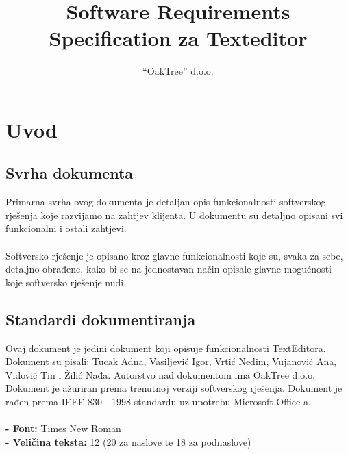 \documentclass[utf8]{article}
\title{Software Requirements Specification za Texteditor}
\author{“OakTree” d.o.o.}
\begin{document}
\maketitle

\section{Uvod}
\subsection{Svrha dokumenta}
Primarna svrha ovog dokumenta je detaljan opis funkcionalnosti softverskog rješenja koje razvijamo na zahtjev klijenta. U dokumentu su detaljno opisani svi funkcionalni i ostali zahtjevi.\\
\\
Softversko rješenje je opisano kroz glavne funkcionalnosti koje su, svaka za sebe, detaljno obrađene, kako bi se na jednostavan način opisale glavne mogućnosti koje softversko rješenje nudi.

\subsection{Standardi dokumentiranja}
Ovaj dokument je jedini dokument koji opisuje funkcionalnosti TextEditora.     Dokument su pisali: Tucak Adna, Vasiljević Igor, Vrtić Nedim, Vujanović Ana, Vidović Tin i Žilić Nađa. Autorstvo nad dokumentom ima OakTree d.o.o. Dokument je ažuriran prema trenutnoj verziji softverskog rješenja. Dokument je rađen prema IEEE 830 - 1998 standardu uz upotrebu Microsoft Office-a.\\
\\
	    \textbf{-  Font:} Times New Roman\\
	    \textbf{-  Veličina teksta:} 12 (20 za naslove te 18 za podnaslove)
\end{document}
